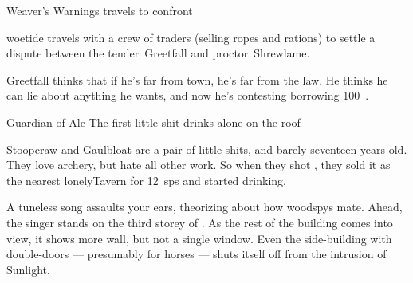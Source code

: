 \documentclass[10pt,twoside]{book}
\begin{document}






\pagestyle{minizine}%

{Weaver's Warnings}%
{ travels to confront }%

\Gls{woetide} travels with a crew of traders (selling ropes and \glspl{ration}) to settle a dispute between the \gls{tender}~Greetfall and \gls{proctor}~Shrewlame.

\begin{speechtext}
  Greetfall thinks that if he's far from town, he's far from the law.
  He thinks he can lie about anything he wants, and now he's contesting borrowing 100~.
\end{speechtext}


{Guardian of Ale}%
{The first little shit drinks alone on the roof}%

Stoopcraw and Gaulbloat are a pair of little shits, and barely seventeen years old.
They love archery, but hate all other work.
So when they shot , they sold it as the nearest \gls{lonelyTavern} for 12~\glspl{sp} and started drinking.


\begin{boxtext}
  A tuneless song assaults your ears, theorizing about how \glspl{woodspy} mate.
  Ahead, the singer stands on the third storey of .
  As the rest of the building comes into view, it shows more wall, but not a single window.
  Even the side-building with double-doors --- presumably for horses --- shuts itself off from the intrusion of Sunlight.
\end{boxtext}
\end{document}
